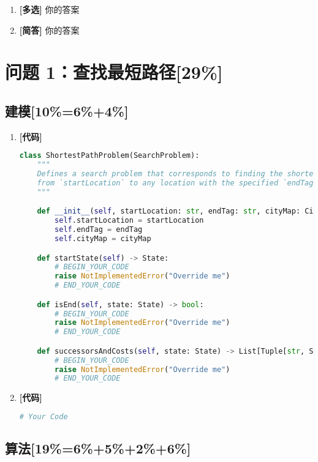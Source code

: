 \documentclass{article}
\begin{document}
\begin{enumerate}[label=(\alph*), start=6]
    \item \textbf{[多选]} 你的答案 %
    \vspace{10pt}

    \item  \textbf{[简答]} %
    你的答案 
\end{enumerate}

\section{问题 1：查找最短路径[29\%]}

\subsection{建模[10\%=6\%+4\%]}

\begin{enumerate}[label=(\alph*), start=1]
    \item \textbf{[代码]} %
    \begin{lstlisting}[language=Python]
    class ShortestPathProblem(SearchProblem):
    """
    Defines a search problem that corresponds to finding the shortest path 
    from `startLocation` to any location with the specified `endTag`.
    """

    def __init__(self, startLocation: str, endTag: str, cityMap: CityMap):
        self.startLocation = startLocation
        self.endTag = endTag
        self.cityMap = cityMap

    def startState(self) -> State:
        # BEGIN_YOUR_CODE 
        raise NotImplementedError("Override me")
        # END_YOUR_CODE

    def isEnd(self, state: State) -> bool:
        # BEGIN_YOUR_CODE 
        raise NotImplementedError("Override me")
        # END_YOUR_CODE

    def successorsAndCosts(self, state: State) -> List[Tuple[str, State, float]]:
        # BEGIN_YOUR_CODE 
        raise NotImplementedError("Override me")
        # END_YOUR_CODE
    \end{lstlisting}

    \item \textbf{[代码]} %
    \begin{lstlisting}[language=Python]
    # Your Code
    \end{lstlisting}
\end{enumerate}

\subsection{算法[19\%=6\%+5\%+2\%+6\%]}
\end{document}
